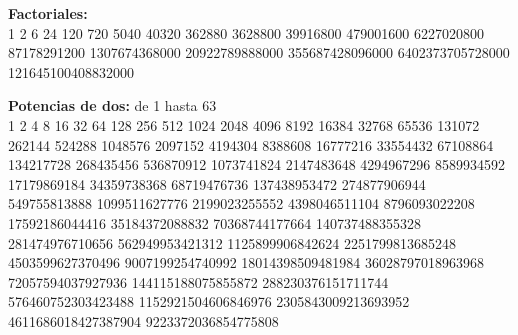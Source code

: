 \documentclass[10pt,landscape,twocolumn,letterpaper,twosided]{article}
\begin{document}
	\vspace{8mm}
	\textbf{Factoriales:}\\
	\vspace{3mm}
	1 2 6 24 120 720 5040 40320 362880 3628800 39916800 479001600 6227020800 87178291200 1307674368000 20922789888000
	355687428096000 6402373705728000 121645100408832000
	
	\vspace{8mm}
	\textbf{Potencias de dos:} de 1 hasta 63\\
	\vspace{3mm}
	1 2 4 8 16 32 64 128 256 512 1024 2048 4096 8192 16384 32768 65536 131072 262144 524288 1048576 2097152 4194304 8388608
	16777216 33554432 67108864 134217728 268435456 536870912 1073741824 2147483648 4294967296 8589934592 17179869184
	34359738368 68719476736 137438953472 274877906944 549755813888 1099511627776 2199023255552 4398046511104 8796093022208
	17592186044416 35184372088832 70368744177664 140737488355328 281474976710656 562949953421312 1125899906842624
	2251799813685248 4503599627370496 9007199254740992 18014398509481984 36028797018963968 72057594037927936
	144115188075855872 288230376151711744 576460752303423488 1152921504606846976 2305843009213693952 4611686018427387904
	9223372036854775808
\end{document}
